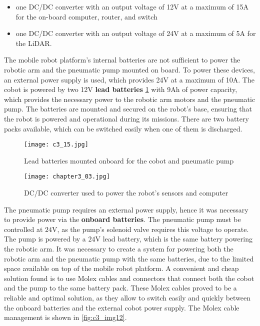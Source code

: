 \begin{itemize}
    \item one DC/DC converter with an output voltage of 12V at a maximum of 15A for the on-board computer, router, and switch
    \item one DC/DC converter with an output voltage of 24V at a maximum of 5A for the LiDAR.
\end{itemize}

The mobile robot platform's internal batteries are not sufficient to power the robotic arm and the pneumatic pump
mounted on board. To power these devices, an external power supply is used, which provides 24V at a maximum of 10A.
The cobot is powered by two 12V \textbf{lead batteries} \ref{fig:c3_img15} with 9Ah of power capacity, 
which provides the necessary power to the robotic arm motors and the pneumatic pump. 
The batteries are mounted and secured on the robot's base,
ensuring that the robot is powered and operational during its missions. There are two battery packs available,
which can be switched easily when one of them is discharged.

\begin{figure}[hpt]
    \centering
    \texttt{[image: c3\_15.jpg]}
    \captionsetup{width=1\linewidth}
    \caption{Lead batteries mounted onboard for the cobot and pneumatic pump}
    \label{fig:c3_img15}
\end{figure}

\begin{figure}[hpt]
    \centering
    \texttt{[image: chapter3\_03.jpg]}
    \captionsetup{width=1\linewidth}
    \caption{DC/DC converter used to power the robot's sensors and computer}
    \label{fig:c3_img03}
\end{figure}

The pneumatic pump requires an external power supply, hence it was necessary to provide power via
the \textbf{onboard batteries}.
The pneumatic pump must be controlled at $24$V, as the pump's solenoid valve requires this voltage to operate.
The pump is powered by a $24$V lead battery, which is the same battery powering
the robotic arm. It was necessary to create a system for powering both the robotic arm and the pneumatic pump
with the same batteries, due to the limited space available on top of the mobile robot platform.
A convenient and cheap solution found is to use Molex cables and connectors that connect both the cobot
and the pump to the same battery pack.
These Molex cables proved to be a reliable and optimal solution, as they allow to switch easily and quickly
between the onboard batteries and the external cobot power supply.
The Molex cable management is shown in \ref{fig:c3_img12}.

